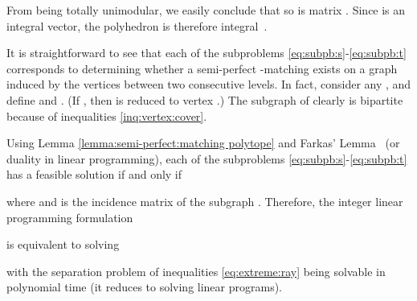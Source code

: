 From  being totally unimodular, we easily conclude that so is
matrix .  Since  is an integral vector, the polyhedron
 is therefore integral~\cite{hoffmankruskal}.  \epr




It is straightforward to see that each of the subproblems
\eqref{eq:subpb:s}-\eqref{eq:subpb:t} corresponds to determining
whether a semi-perfect -matching exists on a graph induced by the
vertices between two consecutive levels. In fact, consider any , and define  and . (If , then  is reduced to vertex .)
The subgraph  of  clearly is bipartite because of inequalities
\eqref{inq:vertex:cover}.

Using Lemma \ref{lemma:semi-perfect:matching polytope} and Farkas'
Lemma~\cite{farkas1902} (or duality in linear programming), each of
the subproblems \eqref{eq:subpb:s}-\eqref{eq:subpb:t} has a feasible
solution if and only if

where  and  is the incidence matrix
of the subgraph .  Therefore, the integer linear programming
formulation

is equivalent to solving

with the separation problem of inequalities \eqref{eq:extreme:ray}
being solvable in polynomial time (it reduces to solving linear
programs).

